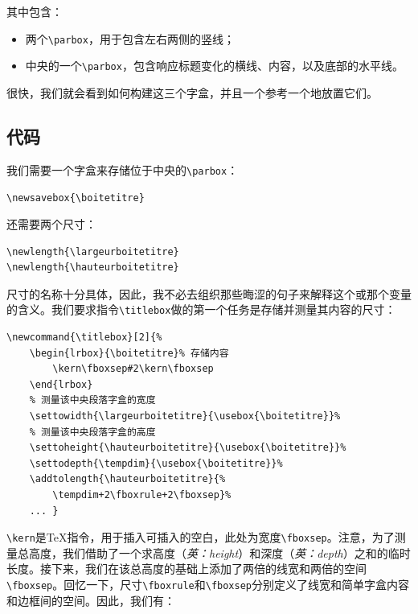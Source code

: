 其中包含：

\begin{itemize}
    \item 两个\verb|\parbox|，用于包含左右两侧的竖线；
    \item 中央的一个\verb|\parbox|，包含响应标题变化的横线、内容，以及底部的水平线。
\end{itemize}

很快，我们就会看到如何构建这三个字盒，并且一个参考一个地放置它们。

\subsection{代码}

我们需要一个字盒来存储位于中央的\verb|\parbox|：

\begin{dmd}
\verb|\newsavebox{\boitetitre}|
\end{dmd}

还需要两个尺寸：

\begin{dmd}
\begin{verbatim}
\newlength{\largeurboitetitre}
\newlength{\hauteurboitetitre}\end{verbatim}
\end{dmd}

尺寸的名称十分具体，因此，我不必去组织那些晦涩的句子来解释这个或那个变量的含义。我们要求指令\verb|\titlebox|做的第一个任务是存储并测量其内容的尺寸：

\begin{dmd}
\begin{verbatim}
\newcommand{\titlebox}[2]{% 
    \begin{lrbox}{\boitetitre}% 存储内容
        \kern\fboxsep#2\kern\fboxsep
    \end{lrbox}
    % 测量该中央段落字盒的宽度 
    \settowidth{\largeurboitetitre}{\usebox{\boitetitre}}% 
    % 测量该中央段落字盒的高度
    \settoheight{\hauteurboitetitre}{\usebox{\boitetitre}}% 
    \settodepth{\tempdim}{\usebox{\boitetitre}}% 
    \addtolength{\hauteurboitetitre}{%
        \tempdim+2\fboxrule+2\fboxsep}%
    ... }\end{verbatim}
\end{dmd}

\verb|\kern|是\TeX 指令，用于插入可插入的空白，此处为宽度\verb|\fboxsep|。注意，为了测量总高度，我们借助了一个求高度（\emph{英：height}）和深度（\emph{英：depth}）之和的临时长度。接下来，我们在该总高度的基础上添加了两倍的线宽和两倍的空间\verb|\fboxsep|。回忆一下，尺寸\verb|\fboxrule|和\verb|\fboxsep|分别定义了线宽和简单字盒内容和边框间的空间。因此，我们有：

